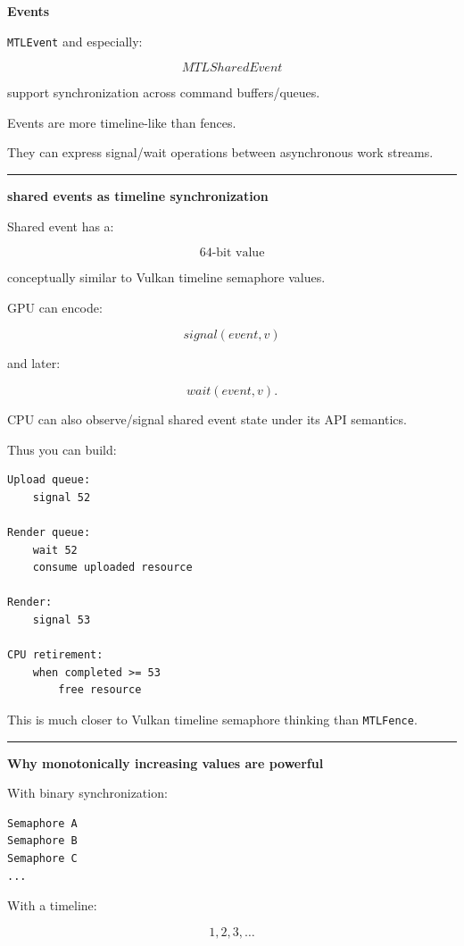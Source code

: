 \textbf{Events}

\texttt{MTLEvent} and especially:

\[
MTLSharedEvent
\]

support synchronization across command buffers/queues.

Events are more timeline-like than fences.

They can express signal/wait operations between asynchronous work streams.

\begin{center}\rule{0.5\linewidth}{0.5pt}\end{center}

\textbf{shared events as timeline synchronization}

Shared event has a:

\[
64\text{-bit value}
\]

conceptually similar to Vulkan timeline semaphore values.

GPU can encode:

\[
signal(event,v)
\]

and later:

\[
wait(event,v).
\]

CPU can also observe/signal shared event state under its API semantics.

Thus you can build:

\begin{verbatim}
Upload queue:
    signal 52

Render queue:
    wait 52
    consume uploaded resource

Render:
    signal 53

CPU retirement:
    when completed >= 53
        free resource
\end{verbatim}

This is much closer to Vulkan timeline semaphore thinking than \texttt{MTLFence}.

\begin{center}\rule{0.5\linewidth}{0.5pt}\end{center}

\textbf{Why monotonically increasing values are powerful}

With binary synchronization:

\begin{verbatim}
Semaphore A
Semaphore B
Semaphore C
...
\end{verbatim}

With a timeline:

\[
1,2,3,\dots
\]

